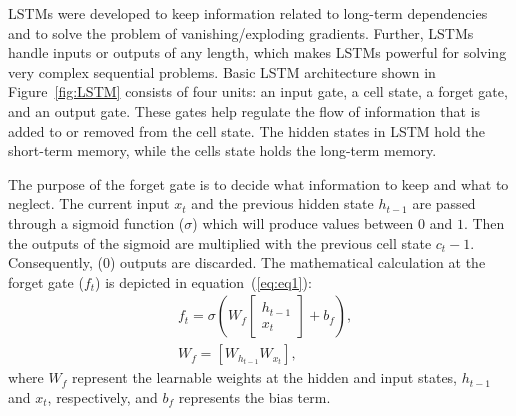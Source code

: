 LSTMs were developed to keep information related to long-term dependencies and to solve the problem of vanishing/exploding gradients.
Further, LSTMs handle inputs or outputs of any length, which makes LSTMs powerful for solving very complex sequential problems. 
Basic LSTM architecture shown in Figure~\ref{fig:LSTM} consists of four units: 
an input gate, a cell state, a forget gate, and an output gate.
These gates help regulate the flow of information that is added to or removed from the cell state. 
The hidden states in LSTM hold the short-term memory, while the cells state holds the long-term memory.

The purpose of the forget gate is to decide what information to keep and what to neglect. 
The current input \(x_{t}\) and the previous hidden state  \(h_{t-1}\) are passed through a sigmoid function (\(\sigma\)) which will produce values between \(0\) and \(1\).
Then the outputs of the sigmoid are multiplied with the previous cell state \(c_t-1\). 
Consequently, (\(0\)) outputs are discarded.
The mathematical calculation at the forget gate ($f_t$) is depicted in 
equation~(\ref{eq:eq1}):
\begin{equation}
\begin{aligned}
	&f_{t}=\sigma\left( W_{f}  
	\left[
	\begin{array}{c}
		h_{t-1} \\ x_{t}
	\end{array} 
	\right]
	+ b_{f} \right), \\
	&W_{f} = \left[ W_{h_{t-1}}  W_{x_{t}} \right],
	\label{eq:eq1}
\end{aligned}
\end{equation}
where \(W_{f}\) represent the learnable weights at the hidden and input states, \(h_{t-1}\) and \(x_{t}\), respectively, and \(b_{f}\) represents the bias term. 

